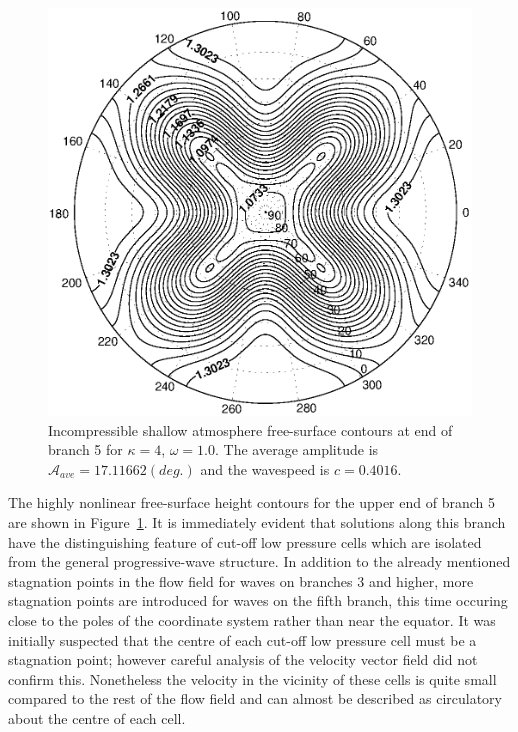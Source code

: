 \begin{figure}[htbp]
	\centering
		\includegraphics[scale=0.75]{IMAGES/k4w1fsb5end.eps}
	\caption{Incompressible shallow atmosphere free-surface contours at end of branch 5 for $\kappa=4$, $\omega=1.0$. The average amplitude is $\mathcal{A}_{ave}=17.11662 (deg.)$ and the wavespeed is $c=0.4016$.}
	\label{fig:k4w1fsb5end}
\end{figure}
The highly nonlinear free-surface height contours for the upper end of branch 5 are shown in Figure~\ref{fig:k4w1fsb5end}. It is immediately evident that solutions along this branch have the distinguishing feature of cut-off low pressure cells which are isolated from the general progressive-wave structure. In addition to the already mentioned stagnation points in the flow field for waves on branches 3 and higher, more stagnation points are introduced for waves on the fifth branch, this time occuring close to the poles of the coordinate system rather than near the equator. It was initially suspected that the centre of each cut-off low pressure cell must be a stagnation point; however careful analysis of the velocity vector field did not confirm this. Nonetheless the velocity in the vicinity of these cells is quite small compared to the rest of the flow field and can almost be described as circulatory about the centre of each cell.

